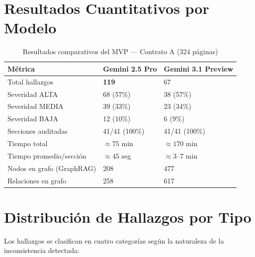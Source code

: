 \section*{Resultados Cuantitativos por Modelo}

\begin{table}[H]
\centering
\caption{Resultados comparativos del MVP — Contrato A (324 páginas)}
\label{tab:resultados_mvp}
\begin{tabular}{p{4.5cm} p{3cm} p{3cm}}
\toprule
\textbf{Métrica} & \textbf{Gemini 2.5 Pro} & \textbf{Gemini 3.1 Preview} \\
\midrule
Total hallazgos           & \textbf{119}       & 67 \\
Severidad ALTA            & 68 (57\%)          & 38 (57\%) \\
Severidad MEDIA           & 39 (33\%)          & 23 (34\%) \\
Severidad BAJA            & 12 (10\%)          & 6 (9\%) \\
Secciones auditadas       & 41/41 (100\%)      & 41/41 (100\%) \\
Tiempo total              & $\approx 75$ min   & $\approx 170$ min \\
Tiempo promedio/sección   & $\approx 45$ seg   & $\approx 3$--$7$ min \\
Nodos en grafo (GraphRAG) & 208                & 477 \\
Relaciones en grafo       & 258                & 617 \\
\bottomrule
\end{tabular}
\end{table}

\section*{Distribución de Hallazgos por Tipo}

Los hallazgos se clasifican en cuatro categorías según la naturaleza
de la inconsistencia detectada:

